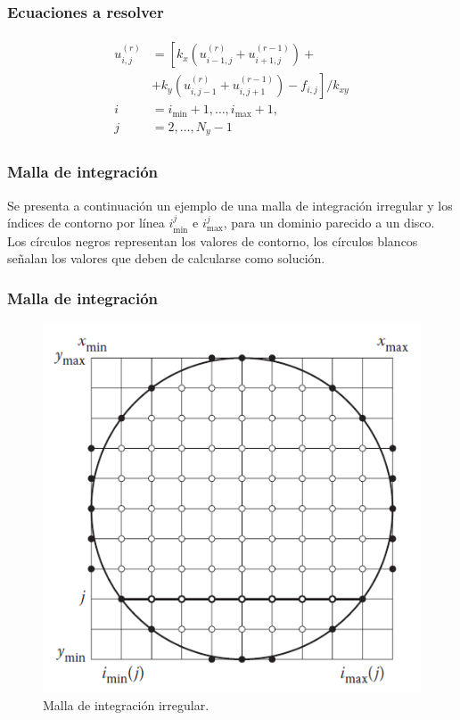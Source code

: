 \begin{frame}
\frametitle{Ecuaciones a resolver}
\begin{align}
\begin{aligned}
u_{i, j}^{(r)} &= \left[ k_{x} \left( u_{i-1, j}^{(r)} + u_{i+1, j}^{(r-1)} \right) + \right. \\[0.5em]
&\left. + k_{y} \left( u_{i, j-1}^{(r)} + u_{i, j+1}^{(r-1)} \right) - f_{i, j}  \right] / k_{x y} \\[0.5em]
i &= i_{\min} + 1, \ldots, i_{\max} + 1, \\[0.5em]
j &= 2, \ldots, N_{y} - 1
\end{aligned}
\label{eq:ecuacion_13_33}
\end{align}
\end{frame}
\begin{frame}
\frametitle{Malla de integración}
Se presenta a continuación un ejemplo de una malla de integración irregular y los índices de contorno por línea $i_{\min}^{j}$ e $i_{\max}^{j}$, para un dominio parecido a un disco.
\\
\bigskip
Los círculos negros representan los valores de contorno, los círculos blancos señalan los valores que deben de calcularse como solución.
\end{frame}
{
\begin{frame}
\frametitle{Malla de integración}
\begin{figure}[h!]
   \centering
   \includegraphics[scale=0.5]{Imagenes/malla_integracion_irregular_01.png}
   \caption{Malla de integración irregular.}
\end{figure}
\end{frame}
}
